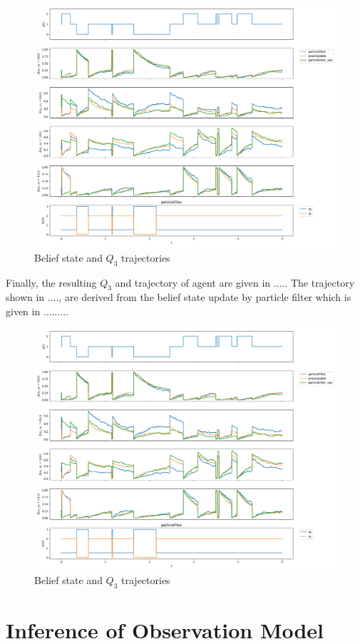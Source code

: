 \begin{figure}[H]
	\begin{center}
		\includegraphics[width=.60\textwidth]{figures/b_q_traj}
		\caption{Belief state and $ Q_3 $ trajectories}
		\label{fig:b_q_traj}
	\end{center}
\end{figure}
Finally, the resulting $ Q_3 $ and trajectory of agent are given in ..... The trajectory shown in ...., are derived from the belief state update by particle filter which is given in .........
\begin{figure}[H]
	\begin{center}
		\includegraphics[width=.60\textwidth]{figures/b_q_traj}
		\caption{Belief state and $ Q_3 $ trajectories}
		\label{fig:b_q_traj}
	\end{center}
\end{figure}
\section{Inference of Observation Model}
